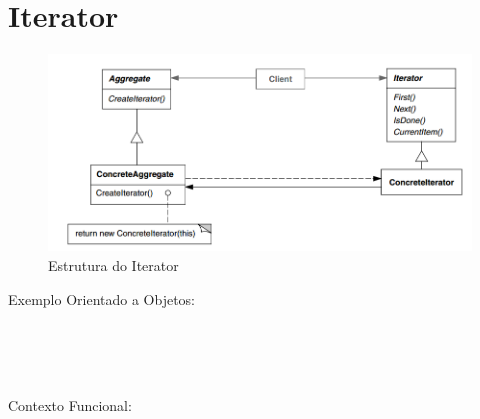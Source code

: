 \section{Iterator}

\begin{figure}[htb]
	\caption{\label{fig_grafico}Estrutura do Iterator}
	\begin{center}
	    \includegraphics[scale=0.5]{5_padroes-contexto-funcional/5.3_comportamentais/5.3.04_iterator/diagram.png}
	\end{center}
\end{figure}

Exemplo Orientado a Objetos:

\begin{lstlisting}[caption={Iterator Orientação a Objetos},label=ooiterator]


    
\end{lstlisting}

Contexto Funcional:


\begin{lstlisting}[caption={Iterator Funcional},label=fpiterator]
    

    
\end{lstlisting}